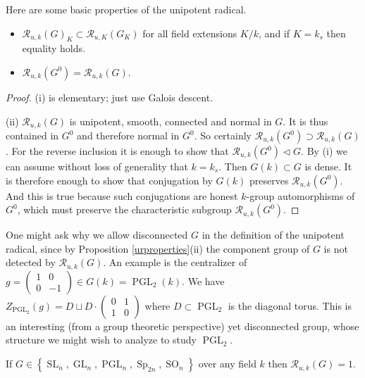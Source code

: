 \documentclass[10pt]{article}
\renewcommand{\(}{\left(}
\renewcommand{\)}{\right)}
\numberwithin{thm}{subsection}
\begin{document}
Here are some basic properties of the unipotent radical.
\begin{prop}\label{urproperties}
\begin{itemize}
\item[(i)]$\mathscr{R}_{u,k}(G)_K\subset \mathscr{R}_{u,K}(G_K)$
for all field extensions $K/k$,
and if $K=k_s$ then equality holds.
\item[(ii)]$\mathscr{R}_{u,k}(G^0)=\mathscr{R}_{u,k}(G)$.
\end{itemize}
\end{prop}
\begin{proof}
(i) is elementary; just use Galois descent.

(ii) $\mathscr{R}_{u,k}(G)$ is unipotent, smooth, connected
and normal in $G$. It is thus contained in $G^0$
and therefore normal in $G^0$.
So certainly $\mathscr{R}_{u,k}(G^0)\supset \mathscr{R}_{u,k}(G)$.
For the reverse inclusion it is enough to show that
$\mathscr{R}_{u,k}(G^0)\vartriangleleft G$.
By (i) we can assume without loss of generality that $k=k_s$.
Then $G(k)\subset G$ is dense.
It is therefore enough to show that conjugation by $G(k)$ preserves
$\mathscr{R}_{u,k}(G^0)$.
And this is true because such conjugations are honest $k$-group automorphisms
of $G^0$, which must preserve the characteristic subgroup $\mathscr{R}_{u,k}(G^0)$. 
\end{proof}
\begin{rem}\label{}
One might ask why we allow disconnected $G$ in the definition of the unipotent radical, since by 
Proposition \ref{urproperties}(ii)
the component group of $G$
is not detected by $\mathscr{R}_{u,k}(G)$.
An example is the centralizer of $g=\left(\begin{smallmatrix}
 1&0\\0&-1
\end{smallmatrix}\right)\in G(k)=\operatorname{PGL}_2(k)$.
We have $Z_{\operatorname{PGL}_2}(g)= D\sqcup D\cdot \left(\begin{smallmatrix}
 0&1\\1&0
\end{smallmatrix}\right)$
where $D\subset \operatorname{PGL}_2$ is the diagonal torus.
This is an interesting (from a group theoretic perspective)
yet disconnected group,
whose structure we might wish to analyze to study $\operatorname{PGL}_2$.
\end{rem}
 \begin{ex}[Homework 9]
If $G\in\left\{\operatorname{SL}_n,\operatorname{GL}_n,\operatorname{PGL}_n,\operatorname{Sp}_{2n},\operatorname{SO}_n\right\}$
over any field $k$
then $\mathscr{R}_{u,k}(G)=1$.
\end{ex}
\end{document}
